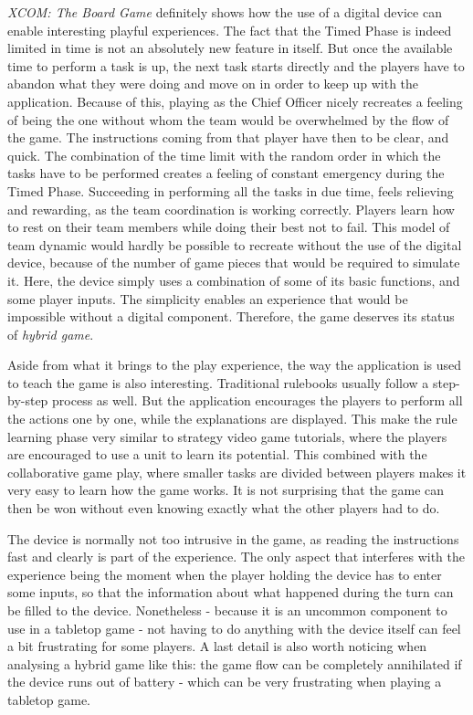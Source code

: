 \textit{XCOM: The Board Game} definitely shows how the use of a digital device can enable interesting playful experiences. The fact that the Timed Phase is indeed limited in time is not an absolutely new feature in itself. But once the available time to perform a task is up, the next task starts directly and the players have to abandon what they were doing and move on in order to keep up with the application. 
Because of this, playing as the Chief Officer nicely recreates a feeling of being the one without whom the team would be overwhelmed by the flow of the game. The instructions coming from that player have then to be clear, and quick. The combination of the time limit with the random order in which the tasks have to be performed creates a feeling of constant emergency during the Timed Phase. Succeeding in performing all the tasks in due time, feels relieving and rewarding, as the team coordination is working correctly. Players learn how to rest on their team members while doing their best not to fail. 
This model of team dynamic would hardly be possible to recreate without the use of the digital device, because of the number of game pieces that would be required to simulate it. Here, the device simply uses a combination of some of its basic functions, and some player inputs. The simplicity enables an experience that would be impossible without a digital component. Therefore, the game deserves its status of \textit{hybrid game}.

Aside from what it brings to the play experience, the way the application is used to teach the game is also interesting. Traditional rulebooks usually follow a step-by-step process as well. But the application encourages the players to perform all the actions one by one, while the explanations are displayed. This make the rule learning phase very similar to strategy video game tutorials, where the players are encouraged to use a unit to learn its potential. This combined with the collaborative game play, where smaller tasks are divided between players makes it very easy to learn how the game works. It is not surprising that the game can then be won without even knowing exactly what the other players had to do.

The device is normally not too intrusive in the game, as reading the instructions fast and clearly is part of the experience. The only aspect that interferes with the experience being the moment when the player holding the device has to enter some inputs, so that the information about what happened during the turn can be filled to the device. Nonetheless - because it is an uncommon component to use in a tabletop game - not having to do anything with the device itself can feel a bit frustrating for some players. A last detail is also worth noticing when analysing a hybrid game like this: the game flow can be completely annihilated if the device runs out of battery - which can be very frustrating when playing a tabletop game. 

